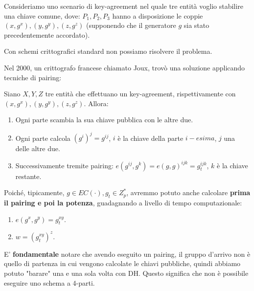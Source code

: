 \begin{problem}[3-party DH] Consideriamo uno scenario di key-agreement nel quale tre entità voglio stabilire una chiave comune, dove:
$P_1,P_2,P_3$ hanno a disposizione le coppie $(x,g^x),(y,g^y),(z,g^z)$ (supponendo che il generatore $g$ sia stato precedentemente accordato).
\begin{remark}
Con schemi crittografici standard non possiamo risolvere il problema.
\end{remark}
Nel 2000, un crittografo francese chiamato Joux, trovò una soluzione applicando tecniche di pairing:
\begin{theorem}\label{thm:dh3}
Siano $X,Y,Z$ tre entità che effettuano un key-agreement, rispettivamente con  $(x,g^x),(y,g^y),(z,g^z)$. Allora:
\begin{enumerate}
    \item Ogni parte scambia la sua chiave pubblica con le altre due.
    \item Ogni parte calcola $(g^i)^j=g^{ij}$, $i$ è la chiave della parte $i-esima$, $j$ una delle altre due.
    \item Successivamente tremite pairing: $e(g^{ij},g^k)=e(g,g)^{ijk}=g_t^{ijk}$, $k$ è la chiave restante.
\end{enumerate}
\begin{remark}
Poiché, tipicamente, $g\in{EC(\cdot)},g_t\in{Z_p^*}$, avremmo potuto anche calcolare \textbf{prima il pairing e poi la potenza}, guadagnando a livello di tempo computazionale:
\begin{enumerate}
    \item $e(g^x,g^y)=g_t^{xy}$.
    \item $w=(g_t^{xy})^z$.
\end{enumerate}
\end{remark}
\end{theorem}
\begin{remark}
E' \textbf{fondamentale} notare che avendo eseguito un pairing, il gruppo d'arrivo non è quello di partenza in cui vengono calcolate le chiavi pubbliche, quindi abbiamo potuto "barare" una e una sola volta con DH. Questo significa che non è possibile eseguire uno schema a 4-parti.
\end{remark}
\end{problem}
